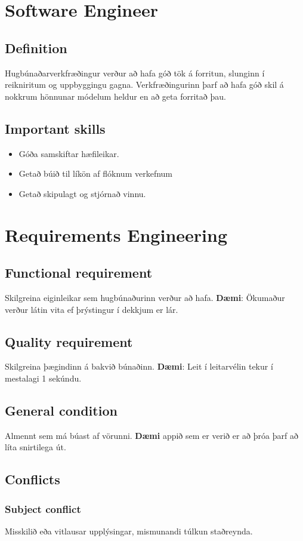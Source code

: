 \documentclass[openany]{article}
\begin{document}
\section{Software Engineer}
\subsection{Definition}
Hugbúnaðarverkfræðingur verður að hafa góð tök á forritun, slunginn í reikniritum og uppbyggingu gagna. Verkfræðingurinn þarf að hafa góð skil á nokkrum hönnunar módelum heldur en að geta forritað þau.
\subsection{Important skills}
\begin{itemize}
	\item Góða samskiftar hæfileikar.
	\item Getað búið til líkön af flóknum verkefnum
	\item Getað skipulagt og stjórnað vinnu.
\end{itemize}

\section{Requirements Engineering}
\subsection{Functional requirement}
Skilgreina eiginleikar sem hugbúnaðurinn verður að hafa. \textbf{Dæmi}: Ökumaður verður látin vita ef þrýstingur í dekkjum er lár.
\subsection{Quality requirement}
Skilgreina þægindinn á bakvið búnaðinn. \textbf{Dæmi}: Leit í leitarvélin tekur í mestalagi 1 sekúndu.
\subsection{General condition}
Almennt sem má búast af vörunni. \textbf{Dæmi} appið sem er verið er að þróa þarf að líta snirtilega út.
\subsection{Conflicts}
\subsubsection{Subject conflict}
Misskilið eða vitlausar upplýsingar, mismunandi túlkun staðreynda.
\end{document}
